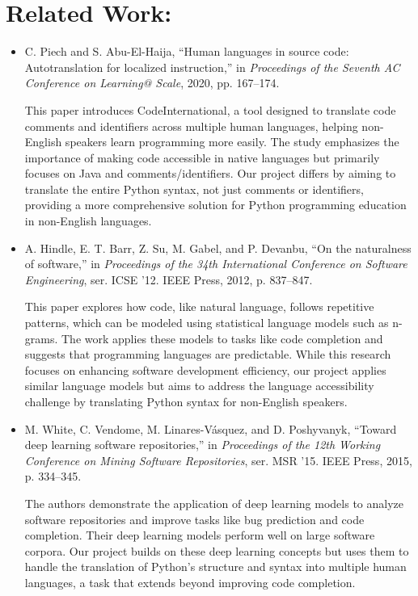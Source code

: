 \documentclass[9pt]{article}
\begin{document}
\section{Related Work:}
    \begin{itemize}
        \item C. Piech and S. Abu-El-Haija, “Human languages in source code: Autotranslation for localized instruction,” in \textit{Proceedings of the Seventh AC Conference on Learning@ Scale}, 2020, pp. 167–174.

        This paper introduces CodeInternational, a tool designed to translate code comments and identifiers across multiple human languages, helping non-English speakers learn programming more easily. The study emphasizes the importance of making code accessible in native languages but primarily focuses on Java and comments/identifiers. Our project differs by aiming to translate the entire Python syntax, not just comments or identifiers, providing a more comprehensive solution for Python programming education in non-English languages.
        
        \item A. Hindle, E. T. Barr, Z. Su, M. Gabel, and P. Devanbu, “On the naturalness of software,” in \textit{Proceedings of the 34th International Conference on Software Engineering}, ser. ICSE ’12. IEEE Press, 2012, p. 837–847.
        
        This paper explores how code, like natural language, follows repetitive patterns, which can be modeled using statistical language models such as n-grams. The work applies these models to tasks like code completion and suggests that programming languages are predictable. While this research focuses on enhancing software development efficiency, our project applies similar language models but aims to address the language accessibility challenge by translating Python syntax for non-English speakers.
        
        \item M. White, C. Vendome, M. Linares-Vásquez, and D. Poshyvanyk, “Toward deep learning software repositories,” in \textit{Proceedings of the 12th Working Conference on Mining Software Repositories}, ser. MSR ’15. IEEE Press, 2015, p. 334–345.
        
        The authors demonstrate the application of deep learning models to analyze software repositories and improve tasks like bug prediction and code completion. Their deep learning models perform well on large software corpora. Our project builds on these deep learning concepts but uses them to handle the translation of Python's structure and syntax into multiple human languages, a task that extends beyond improving code completion.
        

\end{itemize}
\end{document}
